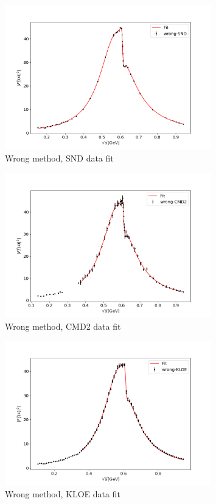 \documentclass[a4paper]{article}
\begin{document}
\begin{figure}[H]
    \centering
    \includegraphics[width=0.8\textwidth]{./plots/wrong-SND.png}
    \caption{Wrong method, SND data fit\label{fig1}}
\end{figure}
\begin{figure}[H]
    \centering
    \includegraphics[width=0.8\textwidth]{./plots/wrong-CMD2.png}
    \caption{Wrong method, CMD2 data fit\label{fig2}}
\end{figure}
\begin{figure}[H]
    \centering
    \includegraphics[width=0.8\textwidth]{./plots/wrong-KLOE.png}
    \caption{Wrong method, KLOE data fit\label{fig3}}
\end{figure}
\end{document}
